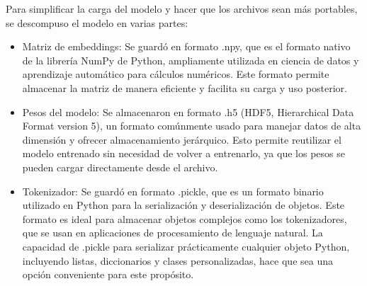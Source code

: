 \begin{itemize}
\end{itemize}

Para simplificar la carga del modelo y hacer que los archivos sean más portables, se descompuso el modelo en varias partes:

\begin{itemize}

\item Matriz de embeddings: Se guardó en formato .npy, que es el formato nativo de la librería NumPy de Python, ampliamente utilizada en ciencia de datos y aprendizaje automático para cálculos numéricos. Este formato permite almacenar la matriz de manera eficiente y facilita su carga y uso posterior.

\item Pesos del modelo: Se almacenaron en formato .h5 (HDF5, Hierarchical Data Format version 5), un formato comúnmente usado para manejar datos de alta dimensión y ofrecer almacenamiento jerárquico. Esto permite reutilizar el modelo entrenado sin necesidad de volver a entrenarlo, ya que los pesos se pueden cargar directamente desde el archivo.

\item Tokenizador: Se guardó en formato .pickle, que es un formato binario utilizado en Python para la serialización y deserialización de objetos. Este formato es ideal para almacenar objetos complejos como los tokenizadores, que se usan en aplicaciones de procesamiento de lenguaje natural. La capacidad de .pickle para serializar prácticamente cualquier objeto Python, incluyendo listas, diccionarios y clases personalizadas, hace que sea una opción conveniente para este propósito.

\end{itemize}

